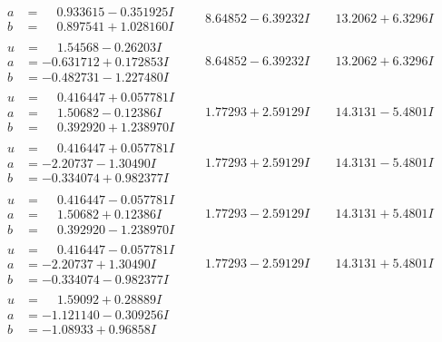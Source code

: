 \documentclass[1p]{elsarticle_modified}
\theoremstyle{definition}
\begin{document}
$$\begin{array}{c|c|c}
\begin{aligned}
a &= \phantom{-}0.933615 - 0.351925 I \\
b &= \phantom{-}0.897541 + 1.028160 I\end{aligned}
 & \phantom{-}8.64852 - 6.39232 I & \phantom{-}13.2062 + 6.3296 I \\ \hline\begin{aligned}
u &= \phantom{-}1.54568 - 0.26203 I \\
a &= -0.631712 + 0.172853 I \\
b &= -0.482731 - 1.227480 I\end{aligned}
 & \phantom{-}8.64852 - 6.39232 I & \phantom{-}13.2062 + 6.3296 I \\ \hline\begin{aligned}
u &= \phantom{-}0.416447 + 0.057781 I \\
a &= \phantom{-}1.50682 - 0.12386 I \\
b &= \phantom{-}0.392920 + 1.238970 I\end{aligned}
 & \phantom{-}1.77293 + 2.59129 I & \phantom{-}14.3131 - 5.4801 I \\ \hline\begin{aligned}
u &= \phantom{-}0.416447 + 0.057781 I \\
a &= -2.20737 - 1.30490 I \\
b &= -0.334074 + 0.982377 I\end{aligned}
 & \phantom{-}1.77293 + 2.59129 I & \phantom{-}14.3131 - 5.4801 I \\ \hline\begin{aligned}
u &= \phantom{-}0.416447 - 0.057781 I \\
a &= \phantom{-}1.50682 + 0.12386 I \\
b &= \phantom{-}0.392920 - 1.238970 I\end{aligned}
 & \phantom{-}1.77293 - 2.59129 I & \phantom{-}14.3131 + 5.4801 I \\ \hline\begin{aligned}
u &= \phantom{-}0.416447 - 0.057781 I \\
a &= -2.20737 + 1.30490 I \\
b &= -0.334074 - 0.982377 I\end{aligned}
 & \phantom{-}1.77293 - 2.59129 I & \phantom{-}14.3131 + 5.4801 I \\ \hline\begin{aligned}
u &= \phantom{-}1.59092 + 0.28889 I \\
a &= -1.121140 - 0.309256 I \\
b &= -1.08933 + 0.96858 I\end{aligned}

\end{array}$$
\end{document}
